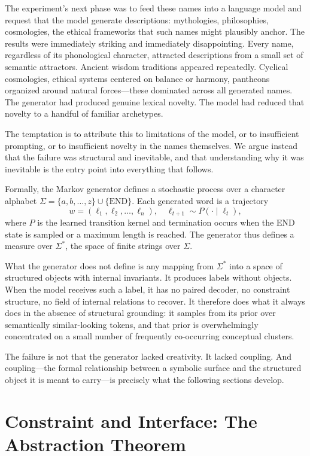 \documentclass[12pt, a4paper]{article}
\theoremstyle{plain}
\theoremstyle{definition}
\theoremstyle{remark}
\begin{document}
The experiment's next phase was to feed these names into a language model and request that the model generate descriptions: mythologies, philosophies, cosmologies, the ethical frameworks that such names might plausibly anchor. The results were immediately striking and immediately disappointing. Every name, regardless of its phonological character, attracted descriptions from a small set of semantic attractors. Ancient wisdom traditions appeared repeatedly. Cyclical cosmologies, ethical systems centered on balance or harmony, pantheons organized around natural forces---these dominated across all generated names. The generator had produced genuine lexical novelty. The model had reduced that novelty to a handful of familiar archetypes.

The temptation is to attribute this to limitations of the model, or to insufficient prompting, or to insufficient novelty in the names themselves. We argue instead that the failure was structural and inevitable, and that understanding why it was inevitable is the entry point into everything that follows.

Formally, the Markov generator defines a stochastic process over a character alphabet $\Sigma = \{a, b, \dots, z\} \cup \{\mathrm{END}\}$. Each generated word is a trajectory
\[
w = (\ell_1, \ell_2, \dots, \ell_n), \quad \ell_{t+1} \sim P(\cdot \mid \ell_t),
\]
where $P$ is the learned transition kernel and termination occurs when the END state is sampled or a maximum length is reached. The generator thus defines a measure over $\Sigma^*$, the space of finite strings over $\Sigma$.

What the generator does not define is any mapping from $\Sigma^*$ into a space of structured objects with internal invariants. It produces labels without objects. When the model receives such a label, it has no paired decoder, no constraint structure, no field of internal relations to recover. It therefore does what it always does in the absence of structural grounding: it samples from its prior over semantically similar-looking tokens, and that prior is overwhelmingly concentrated on a small number of frequently co-occurring conceptual clusters.

The failure is not that the generator lacked creativity. It lacked coupling. And coupling---the formal relationship between a symbolic surface and the structured object it is meant to carry---is precisely what the following sections develop.

\section{Constraint and Interface: The Abstraction Theorem}
\end{document}
